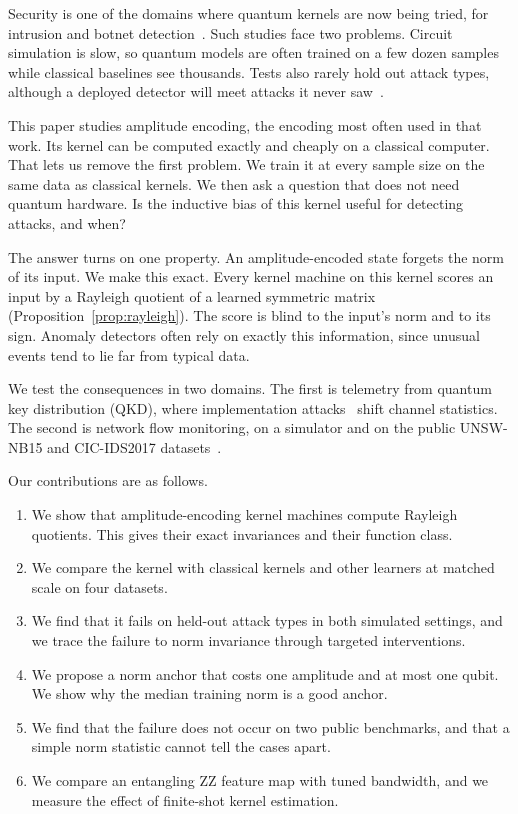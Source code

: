 \documentclass[pdflatex,sn-mathphys-num,lineno]{sn-jnl}
\theoremstyle{thmstyleone}
\begin{document}
Security is one of the domains where quantum kernels are now being tried, for
intrusion and botnet
detection~\cite{kalinin2023security,suryotrisongko2022evaluating}. Such studies
face two problems. Circuit simulation is slow, so quantum models are often trained
on a few dozen samples while classical baselines see thousands. Tests also rarely
hold out attack types, although a deployed detector will meet attacks it never
saw~\cite{sommer2010outside}.

This paper studies amplitude encoding, the encoding most often used in that work.
Its kernel can be computed exactly and cheaply on a classical computer. That lets
us remove the first problem. We train it at every sample size on the same data as
classical kernels. We then ask a question that does not need quantum hardware. Is
the inductive bias of this kernel useful for detecting attacks, and when?

The answer turns on one property. An amplitude-encoded state forgets the norm of
its input. We make this exact. Every kernel machine on this kernel scores an input
by a Rayleigh quotient of a learned symmetric matrix
(Proposition~\ref{prop:rayleigh}). The score is blind to the input's norm and to
its sign. Anomaly detectors often rely on exactly this information, since unusual
events tend to lie far from typical data.

We test the consequences in two domains. The first is telemetry from quantum key
distribution (QKD), where implementation
attacks~\cite{huttner1995photon,lydersen2010hacking,gisin2006trojan,bennett1992experimental}
shift channel statistics. The second is network flow monitoring, on a simulator
and on the public UNSW-NB15 and CIC-IDS2017
datasets~\cite{moustafa2015unsw,sharafaldin2018toward}.

Our contributions are as follows.
\begin{enumerate}
\item We show that amplitude-encoding kernel machines compute Rayleigh quotients.
  This gives their exact invariances and their function class.
\item We compare the kernel with classical kernels and other learners at matched
  scale on four datasets.
\item We find that it fails on held-out attack types in both simulated settings,
  and we trace the failure to norm invariance through targeted interventions.
\item We propose a norm anchor that costs one amplitude and at most one qubit. We
  show why the median training norm is a good anchor.
\item We find that the failure does not occur on two public benchmarks, and that
  a simple norm statistic cannot tell the cases apart.
\item We compare an entangling ZZ feature map with tuned bandwidth, and we measure
  the effect of finite-shot kernel estimation.
\end{enumerate}
\end{document}
